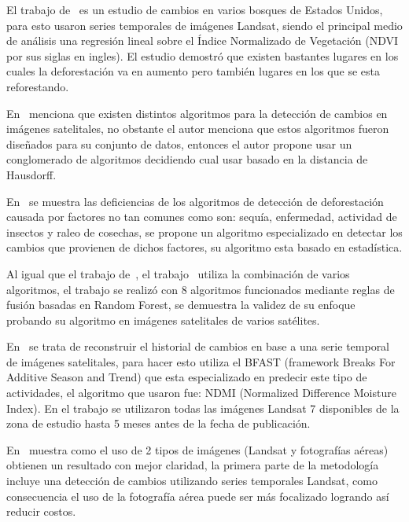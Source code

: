 El trabajo de~\cite{Vogelmann2012} es un estudio de cambios en varios bosques de Estados Unidos, para esto usaron series temporales de imágenes Landsat, siendo el principal medio de análisis una regresión lineal sobre el Índice Normalizado de Vegetación (NDVI por sus siglas en ingles). El estudio demostró que existen bastantes lugares en los cuales la deforestación va en aumento pero también lugares en los que se esta reforestando.

En~\cite{Saxena2018} menciona que existen distintos algoritmos para la detección de cambios en imágenes satelitales, no obstante el autor menciona que estos algoritmos fueron diseñados para su conjunto de datos, entonces el autor propone usar un conglomerado de algoritmos decidiendo cual usar basado en la distancia de Hausdorff. 


En~\cite{Brooks2017} se muestra las deficiencias de los algoritmos de detección de deforestación causada por factores no tan comunes como son: sequía, enfermedad, actividad de insectos y raleo de cosechas, se propone un algoritmo especializado en detectar los cambios que provienen de dichos factores, su algoritmo esta basado en estadística.


Al igual que el trabajo de~\cite{Saxena2018}, el trabajo~\cite{Healey2018} utiliza la combinación de varios algoritmos, el trabajo se realizó con 8 algoritmos funcionados mediante reglas de fusión basadas en Random Forest, se demuestra la validez de su enfoque probando su algoritmo en imágenes satelitales de varios satélites.

En~\cite{Dutrieux2016} se trata de reconstruir el historial de cambios en base a una serie temporal de imágenes satelitales, para hacer esto utiliza el BFAST (framework Breaks For Additive Season and Trend) que esta especializado en predecir este tipo de actividades, el algoritmo que usaron fue: NDMI (Normalized Difference Moisture Index). En el trabajo se utilizaron todas las imágenes Landsat 7 disponibles de la zona de estudio hasta 5 meses antes de la fecha de publicación. 

En~\cite{Schroeder2014} muestra como el uso de 2 tipos de imágenes (Landsat y fotografías aéreas) obtienen un resultado con mejor claridad, la primera parte de la metodología incluye una detección de cambios utilizando series temporales Landsat, como consecuencia el uso de la fotografía aérea puede ser más focalizado logrando así reducir costos.


